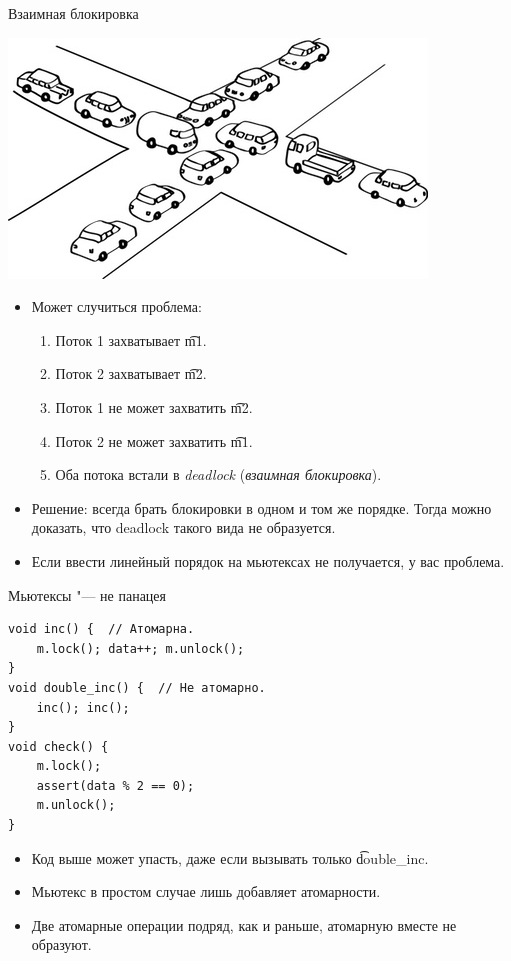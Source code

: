 \begin{frame}{Взаимная блокировка}
	\begin{center}
		\includegraphics{deadlock.jpg}
	\end{center}
	\begin{itemize}
		\item
			Может случиться проблема:
			\begin{enumerate}
				\item Поток 1 захватывает \t{m1}.
				\item Поток 2 захватывает \t{m2}.
				\item Поток 1 не может захватить \t{m2}.
				\item Поток 2 не может захватить \t{m1}.
				\item Оба потока встали в \textit{deadlock} (\textit{взаимная блокировка}).
			\end{enumerate}
		\item
			Решение: всегда брать блокировки в одном и том же порядке.
			Тогда можно доказать, что deadlock такого вида не образуется.
		\item
			Если ввести линейный порядок на мьютексах не получается, у вас проблема.
	\end{itemize}
\end{frame}

\begin{frame}[fragile]{Мьютексы "--- не панацея}
\begin{verbatim}
void inc() {  // Атомарна.
    m.lock(); data++; m.unlock();
}
void double_inc() {  // Не атомарно.
    inc(); inc();
}
void check() {
    m.lock();
    assert(data % 2 == 0);
    m.unlock();
}
\end{verbatim}
	\begin{itemize}
		\item Код выше может упасть, даже если вызывать только \t{double\_inc}.
		\item Мьютекс в простом случае лишь добавляет атомарности.
		\item Две атомарные операции подряд, как и раньше, атомарную вместе не образуют.
	\end{itemize}
\end{frame}

